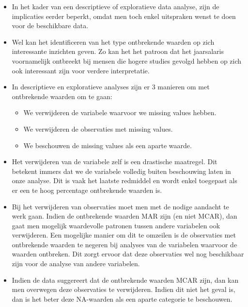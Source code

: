 \documentclass[]{tufte-book}
\providecommand{\tightlist}{%
  \setlength{\itemsep}{0pt}\setlength{\parskip}{0pt}}
\begin{document}
\begin{itemize}
\item
  In het kader van een descriptieve of exploratieve data analyse, zijn de implicaties eerder beperkt, omdat men toch enkel uitspraken wenst te doen voor de beschikbare data.
\item
  Wel kan het identificeren van het type ontbrekende waarden op zich interessante inzichten geven. Zo kan het het patroon dat het jaarsalaris voornamelijk ontbreekt bij mensen die hogere studies gevolgd hebben op zich ook interessant zijn voor verdere interpretatie.
\item
  In descriptieve en exploratieve analyses zijn er 3 manieren om met ontbrekende waarden om te gaan:

  \begin{itemize}
  \tightlist
  \item
    We verwijderen de variabele waarvoor we missing values hebben.
  \item
    We verwijderen de observaties met missing values.
  \item
    We beschouwen de missing values als een aparte waarde.
  \end{itemize}
\item
  Het verwijderen van de variabele zelf is een drastische maatregel. Dit betekent immers dat we de variabele volledig buiten beschouwing laten in onze analyse. Dit is vaak het laatste redmiddel en wordt enkel toegepast als er een te hoog percentage ontbrekende waarden is.
\item
  Bij het verwijderen van observaties moet men met de nodige aandacht te werk gaan. Indien de ontbrekende waarden MAR zijn (en niet MCAR), dan gaat men mogelijk waardevolle patronen tussen andere variabelen ook verwijderen. Een mogelijke manier om dit te omzeilen is de observaties met ontbrekende waarden te negeren bij analyses van de variabelen waarvoor de waarden ontbreken. Dit zorgt ervoor dat deze observaties wel nog beschikbaar zijn voor de analyse van andere variabelen.
\item
  Indien de data suggereert dat de ontbrekende waarden MCAR zijn, dan kan men overwegen deze observaties te verwijderen. Indien dit niet het geval is, dan is het beter deze NA-waarden als een aparte categorie te beschouwen.


\end{itemize}
\end{document}
